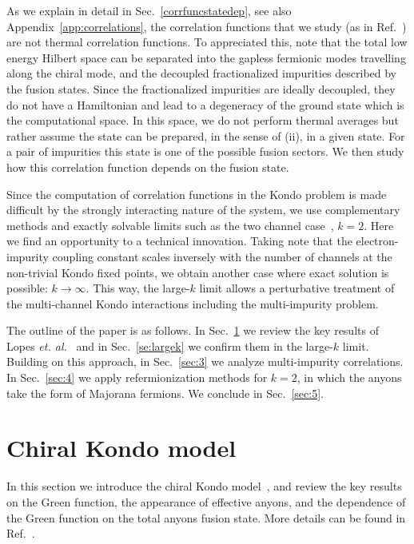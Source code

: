 \documentclass[aps,prb,twocolumn,superscriptaddress]{revtex4-1}
\begin{document}
As we explain in detail in Sec.~\ref{corrfuncstatedep}, see also  Appendix~\ref{app:correlations}, the correlation functions that we study (as in Ref.~) are not thermal correlation functions. To appreciated this, note that the total low energy Hilbert space can be separated into the gapless fermionic modes travelling along the chiral mode, and the decoupled fractionalized impurities described by the fusion states. Since the fractionalized impurities are ideally decoupled, they do not have a Hamiltonian and lead to a degeneracy of the ground state which is the computational space. In this space, we do not perform thermal averages but rather assume the state can be prepared, in the sense of (ii), in a given state. For a pair of impurities this state is one of the possible fusion sectors. %
We then study how this correlation function depends on the fusion state.

Since the computation of correlation functions in the Kondo problem is made difficult by the strongly interacting nature of the system, we use complementary methods and exactly solvable limits such as the two channel case~\cite{emery1992mapping}, $k=2$. 
Here we find an opportunity to a technical innovation. Taking note that the electron-impurity coupling constant scales inversely with the number of channels at the non-trivial Kondo fixed points, we obtain another case where exact solution is possible: $k\to \infty$. This way, the large-$k$ limit allows a perturbative treatment of the multi-channel Kondo interactions including the multi-impurity problem. 

The outline of the paper is as follows. In Sec.~\ref{sec:2} we review the key results of Lopes \textit{et. al.}~\cite{lopes2020anyons} and in Sec.~\ref{se:largek} we confirm them in the large-$k$ limit. Building on this approach, in Sec.~\ref{sec:3} we analyze multi-impurity correlations. In Sec.~\ref{sec:4} we  apply refermionization methods for $k=2$, in which the anyons take the form of Majorana fermions. We conclude in Sec.~\ref{sec:5}. 


\section{Chiral Kondo model} \label{sec:2}
In this section we  introduce the chiral Kondo model~\cite{lopes2020anyons}, and review the key results on the Green function, the appearance of effective anyons, and the dependence of the Green function on the total anyons fusion state.  More details can be found in Ref.~. 
\end{document}
